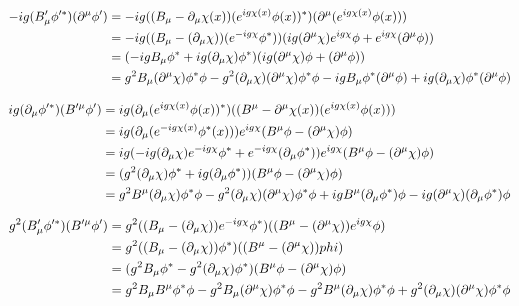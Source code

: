 \begin{align*}
    - ig (B_\mu'\phi'^*) (\partial^\mu\phi') &= - ig ((B_\mu - \partial_\mu \chi(x))(e^{ig\chi(x)}\phi(x))^*) (\partial^\mu(e^{ig\chi(x)}\phi(x))) \\
    &= - ig ((B_\mu - (\partial_\mu \chi))(e^{-ig\chi}\phi^*)) (ig(\partial^\mu \chi)e^{ig\chi}\phi + e^{ig\chi}(\partial^\mu\phi)) \\
    &=  (- ig B_\mu \phi^* + ig(\partial_\mu \chi)\phi^*) (ig(\partial^\mu \chi)\phi + (\partial^\mu\phi)) \\
    &= g^2 B_\mu (\partial^\mu \chi)\phi^*\phi - g^2(\partial_\mu \chi)(\partial^\mu \chi)\phi^*\phi - ig B_\mu \phi^*(\partial^\mu\phi) + ig(\partial_\mu \chi)\phi^*(\partial^\mu\phi) \\
\end{align*}

\begin{align*}
    ig(\partial_\mu\phi'^*)(B'^\mu\phi') &= ig(\partial_\mu(e^{ig\chi(x)}\phi(x))^*)((B^\mu - \partial^\mu \chi(x))(e^{ig\chi(x)}\phi(x))) \\
    &= ig(\partial_\mu(e^{-ig\chi(x)}\phi^*(x)))e^{ig\chi}(B^\mu \phi - (\partial^\mu \chi)\phi) \\
    &= ig(-ig(\partial_\mu \chi)e^{-ig\chi}\phi^* + e^{-ig\chi}(\partial_\mu \phi^*))e^{ig\chi}(B^\mu \phi - (\partial^\mu \chi)\phi) \\
    &= (g^2(\partial_\mu \chi)\phi^* + ig(\partial_\mu \phi^*))(B^\mu \phi - (\partial^\mu \chi)\phi) \\
    &= g^2B^\mu(\partial_\mu \chi)\phi^*\phi - g^2(\partial_\mu \chi)(\partial^\mu \chi)\phi^*\phi + igB^\mu(\partial_\mu \phi^*)\phi - ig(\partial^\mu \chi)(\partial_\mu \phi^*)\phi \\
\end{align*}

\begin{align*}
    g^2(B'_\mu\phi'^*) (B'^\mu \phi') &= g^2((B_\mu - (\partial_\mu \chi))e^{-ig\chi}\phi^*) ((B^\mu - (\partial^\mu \chi)) e^{ig\chi}\phi) \\
    &= g^2((B_\mu - (\partial_\mu \chi))\phi^*) ((B^\mu - (\partial^\mu \chi))phi) \\
    &= (g^2B_\mu\phi^* - g^2(\partial_\mu \chi)\phi^*) (B^\mu \phi - (\partial^\mu \chi)\phi) \\
    &= g^2B_\mu B^\mu \phi^*\phi - g^2B_\mu(\partial^\mu \chi)\phi^*\phi - g^2B^\mu(\partial_\mu \chi)\phi^*\phi + g^2(\partial_\mu \chi)(\partial^\mu \chi)\phi^*\phi \\
\end{align*}

